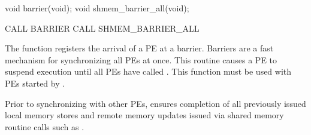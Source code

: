 \synC   %

 void barrier(void);
 void shmem_barrier_all(void);
\synF   %

 CALL BARRIER
 CALL SHMEM_BARRIER_ALL

{   
    The  function registers the arrival of a \ac{PE} at a
    barrier. Barriers are a fast mechanism for synchronizing all \ac{PE}s at
    once. This routine causes a \ac{PE} to suspend execution until all \ac{PE}s have
    called . This function must be used with \ac{PE}s started
    by .

    Prior to synchronizing with other \ac{PE}s,  ensures
    completion of all previously issued local memory stores and remote
    memory updates issued via shared memory routine calls such as
    .
}
{
}
\eAPI 
%
% 
% 
% 
% 
% 
% 
% 
% 
% 
% 
% 
% 
% 
% 
%        
